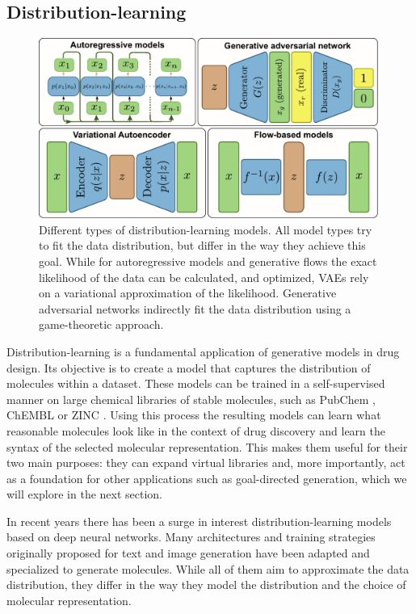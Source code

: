\subsection{Distribution-learning}
\begin{figure}
      \centering
      \includegraphics[width=0.99\textwidth]{figures/distribution-learning-models.pdf}
      \caption{Different types of distribution-learning models. All model types
            try to fit the data distribution, but differ in the way they achieve this goal.
            While for autoregressive models and generative flows the exact likelihood of the data can be calculated,
            and optimized, VAEs rely on a variational approximation of the likelihood. Generative adversarial networks
            indirectly fit the data distribution using a game-theoretic approach. \label{fig:distribution-learning-models}}
\end{figure}
Distribution-learning is a fundamental application of generative models in drug design. Its
objective is to create a model that captures the distribution of molecules within a dataset. These
models can be trained in a self-supervised manner on large chemical libraries of stable molecules,
such as PubChem \citep{kimPubChemSubstanceCompound2016}, ChEMBL
\citep{bentoChEMBLBioactivityDatabase2014} or ZINC \citep{irwinZINCFreeTool2012}. Using this process
the resulting models can learn what reasonable molecules look like in the context of drug discovery
and learn the syntax of the selected molecular representation. This makes them useful for their two
main purposes: they can expand virtual libraries and, more importantly, act as a foundation for other
applications such as goal-directed generation, which we will explore in the next section.

In recent years there has been a surge in interest distribution-learning models based on deep neural
networks. Many architectures and training strategies originally proposed for text and image
generation have been adapted and specialized to generate molecules. While all of them aim to
approximate the data distribution, they differ in the way they model the distribution and the choice
of molecular representation.

